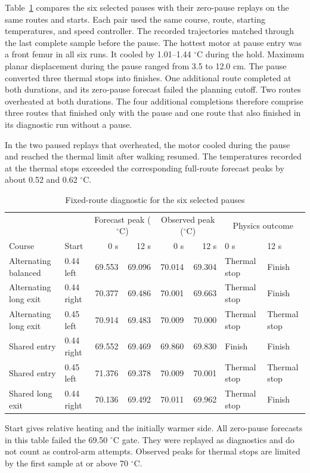 \documentclass{ieeeaccess}
\begin{document}
Table~\ref{tab:matched-same-route} compares the six selected pauses with their zero-pause replays on the same routes and starts. Each pair used the same course, route, starting temperatures, and speed controller. The recorded trajectories matched through the last complete sample before the pause. The hottest motor at pause entry was a front femur in all six runs. It cooled by 1.01--1.44 \ensuremath{{}^{\circ}\mathrm{C}} during the hold. Maximum planar displacement during the pause ranged from 3.5 to 12.0 cm. The pause converted three thermal stops into finishes. One additional route completed at both durations, and its zero-pause forecast failed the planning cutoff. Two routes overheated at both durations. The four additional completions therefore comprise three routes that finished only with the pause and one route that also finished in its diagnostic run without a pause.

In the two paused replays that overheated, the motor cooled during the pause and reached the thermal limit after walking resumed. The temperatures recorded at the thermal stops exceeded the corresponding full-route forecast peaks by about 0.52 and 0.62 \ensuremath{{}^{\circ}\mathrm{C}}.

\begin{table}[!t]
\caption{Fixed-route diagnostic for the six selected pauses}
\label{tab:matched-same-route}
\centering
\footnotesize
\renewcommand{\arraystretch}{1.12}
\begin{tabular}{@{}llrrrrll@{}}
\hline
& & \multicolumn{2}{c}{Forecast peak (\ensuremath{{}^{\circ}\mathrm{C}})}
  & \multicolumn{2}{c}{Observed peak (\ensuremath{{}^{\circ}\mathrm{C}})}
  & \multicolumn{2}{c}{Physics outcome} \\
Course & Start & 0 s & 12 s & 0 s & 12 s & 0 s & 12 s \\
\hline
Alternating balanced & 0.44 left & 69.553 & 69.096 & 70.014 & 69.304 & Thermal stop & Finish \\
Alternating long exit & 0.44 right & 70.377 & 69.486 & 70.001 & 69.663 & Thermal stop & Finish \\
Alternating long exit & 0.45 left & 70.914 & 69.483 & 70.009 & 70.000 & Thermal stop & Thermal stop \\
Shared entry & 0.44 right & 69.552 & 69.469 & 69.860 & 69.830 & Finish & Finish \\
Shared entry & 0.45 left & 71.376 & 69.378 & 70.009 & 70.001 & Thermal stop & Thermal stop \\
Shared long exit & 0.44 right & 70.136 & 69.492 & 70.011 & 69.962 & Thermal stop & Finish \\
\hline
\end{tabular}

\smallskip
\parbox{.96\textwidth}{Start gives relative heating and the initially warmer side. All zero-pause forecasts in this table failed the 69.50 \ensuremath{{}^{\circ}\mathrm{C}} gate. They were replayed as diagnostics and do not count as control-arm attempts. Observed peaks for thermal stops are limited by the first sample at or above 70 \ensuremath{{}^{\circ}\mathrm{C}}.}
\end{table}
\end{document}
